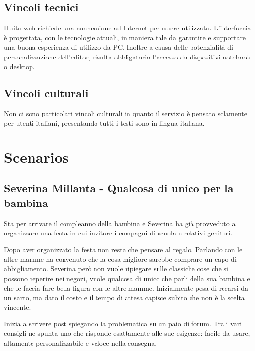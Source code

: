\documentclass[12pt,italian,]{report}
\begin{document}
\subsection{Vincoli tecnici}\label{vincoli-tecnici}

Il sito web richiede una connessione ad Internet per essere utilizzato.
L'interfaccia è progettata, con le tecnologie attuali, in maniera tale da garantire e supportare una buona esperienza di utilizzo da PC.
Inoltre a causa delle potenzialità di personalizzazione dell'editor, risulta obbligatorio l'accesso da dispositivi notebook o desktop.

\subsection{Vincoli culturali}\label{vincoli-culturali}

Non ci sono particolari vincoli culturali in quanto il servizio è pensato solamente per utenti italiani, presentando tutti i testi sono in lingua italiana. 

\section{Scenarios}\label{scenarios}

\hypertarget{severina-millanta---qualcosa-di-unico-per-la-bambina}{%
\subsection{Severina Millanta - Qualcosa di unico per la
bambina}\label{severina-millanta---qualcosa-di-unico-per-la-bambina}}

Sta per arrivare il compleanno della bambina e Severina ha già
provveduto a organizzare una festa in cui invitare i compagni di scuola
e relativi genitori.

Dopo aver organizzato la festa non resta che pensare al regalo. Parlando
con le altre mamme ha convenuto che la cosa migliore sarebbe comprare un
capo di abbigliamento. Severina però non vuole ripiegare sulle classiche
cose che si possono reperire nei negozi, vuole qualcosa di unico che
parli della sua bambina e che le faccia fare bella figura con le altre
mamme. Inizialmente pesa di recarsi da un sarto, ma dato il costo e il
tempo di attesa capisce subito che non è la scelta vincente.

Inizia a scrivere post spiegando la problematica su un paio di forum.
Tra i vari consigli ne spunta uno che risponde esattamente alle sue
esigenze: facile da usare, altamente personalizzabile e veloce nella
consegna.
\end{document}
